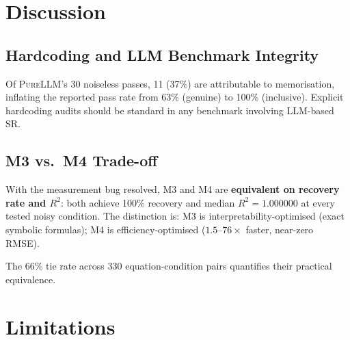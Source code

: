 \documentclass[twoside,11pt]{article}
\newcommand{\PureLLM}{\textsc{PureLLM}}
\newcommand{\Rsq}{R^{2}}
\begin{document}
\section{Discussion}
\label{suppb:discussion}

\subsection{Hardcoding and LLM Benchmark Integrity}

Of \PureLLM{}'s 30 noiseless passes, 11 (37\%) are attributable to
memorisation, inflating the reported pass rate from 63\% (genuine) to
100\% (inclusive).  Explicit hardcoding audits should be standard in any
benchmark involving LLM-based SR.

\subsection{M3 vs.\ M4 Trade-off}

With the measurement bug resolved, M3 and M4 are \textbf{equivalent on
recovery rate and $\Rsq$}: both achieve 100\% recovery and median
$\Rsq = 1.000000$ at every tested noisy condition.  The distinction is:
M3 is interpretability-optimised (exact symbolic formulas); M4 is
efficiency-optimised ($1.5$--$76\times$ faster, near-zero RMSE).

The 66\% tie rate across 330 equation-condition pairs quantifies their
practical equivalence.

\section{Limitations}
\label{suppb:limitations}
\end{document}
